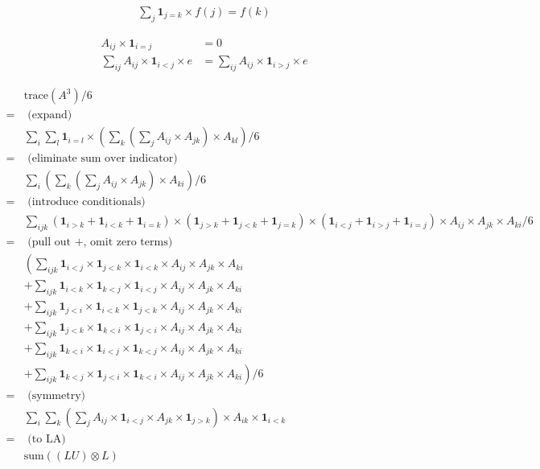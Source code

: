 \documentclass{article}
\newcommand{\I}{\mathbf{1}}
\begin{document}
\begin{align*}
\sum_{j} \I_{j=k} \times f(j) = f(k)
\end{align*}

\begin{align*}
A_{ij} \times \I_{i=j} & = 0 \\
\sum_{ij} A_{ij} \times \I_{i<j} \times e & = \sum_{ij} A_{ij} \times \I_{i>j} \times e
\end{align*}

\begin{align*}
  & \text{trace}(A^3) / 6 \\
= & \text{ (expand)} \\
  & \sum_i \sum_l \I_{i=l} \times \left( \sum_k \left(\sum_j A_{ij} \times A_{jk} \right) \times A_{kl} \right) / 6 \\
= & \text{ (eliminate sum over indicator)} \\
  &  \sum_i \left( \sum_k \left(\sum_j A_{ij} \times A_{jk} \right) \times A_{ki} \right) / 6 \\
= & \text{ (introduce conditionals)}  \\
  & \sum_{ijk} (\I_{i>k} + \I_{i<k} + \I_{i=k})\times (\I_{j>k} + \I_{j<k} + \I_{j=k}) \times (\I_{i<j} + \I_{i>j} + \I_{i=j}) \times A_{ij} \times A_{jk} \times  A_{ki} / 6 \\
= & \text{ (pull out +, omit zero terms) } \\
  & \left( \sum_{ijk} \I_{i<j} \times \I_{j<k} \times \I_{i<k} \times A_{ij} \times A_{jk} \times A_{ki} \right. \\
& + \sum_{ijk} \I_{i<k} \times \I_{k<j} \times \I_{i<j} \times A_{ij} \times A_{jk} \times A_{ki} \\
&+  \sum_{ijk} \I_{j<i} \times \I_{i<k} \times \I_{j<k} \times A_{ij} \times A_{jk} \times A_{ki} \\
&+  \sum_{ijk} \I_{j<k} \times \I_{k<i} \times \I_{j<i} \times A_{ij} \times A_{jk} \times A_{ki} \\
&+  \sum_{ijk} \I_{k<i} \times \I_{i<j} \times \I_{k<j} \times A_{ij} \times A_{jk} \times A_{ki} \\
&+  \left. \sum_{ijk} \I_{k<j} \times \I_{j<i} \times \I_{k<i} \times A_{ij} \times A_{jk} \times A_{ki} \right) / 6 \\
= & \text{ (symmetry)} \\
  & \sum_i \sum_k \left(\sum_j A_{ij} \times \I_{i<j} \times A_{jk} \times \I_{j>k}\right) \times A_{ik} \times \I_{i<k} \\
= & \text{ (to LA)} \\
  & \text{sum} ((LU) \otimes L)
\end{align*}

\end{document}
